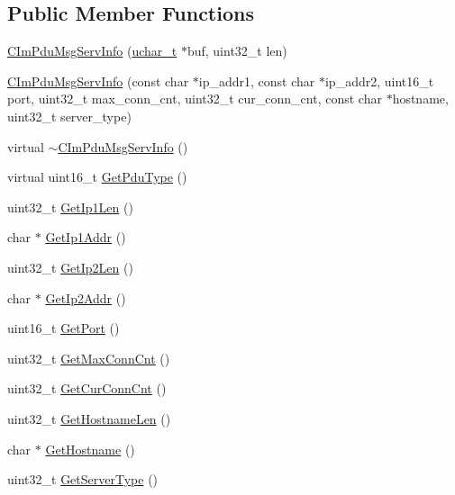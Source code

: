 \subsection*{Public Member Functions}
\begin{DoxyCompactItemize}
\item 
\hyperlink{class_c_im_pdu_msg_serv_info_a7532473060b500eb6f16480ea0c778d7}{C\+Im\+Pdu\+Msg\+Serv\+Info} (\hyperlink{base_2ostype_8h_a124ea0f8f4a23a0a286b5582137f0b8d}{uchar\+\_\+t} $\ast$buf, uint32\+\_\+t len)
\item 
\hyperlink{class_c_im_pdu_msg_serv_info_a37ccf7d9bf3b3b31d85e4bc34bd1525b}{C\+Im\+Pdu\+Msg\+Serv\+Info} (const char $\ast$ip\+\_\+addr1, const char $\ast$ip\+\_\+addr2, uint16\+\_\+t port, uint32\+\_\+t max\+\_\+conn\+\_\+cnt, uint32\+\_\+t cur\+\_\+conn\+\_\+cnt, const char $\ast$hostname, uint32\+\_\+t server\+\_\+type)
\item 
virtual \hyperlink{class_c_im_pdu_msg_serv_info_adecac9eab2944db745a3ff528f0d6c89}{$\sim$\+C\+Im\+Pdu\+Msg\+Serv\+Info} ()
\item 
virtual uint16\+\_\+t \hyperlink{class_c_im_pdu_msg_serv_info_a46ae101775a1fc2d1ea19c5fe73baa9d}{Get\+Pdu\+Type} ()
\item 
uint32\+\_\+t \hyperlink{class_c_im_pdu_msg_serv_info_a792373ba877467a24968414bc0d84208}{Get\+Ip1\+Len} ()
\item 
char $\ast$ \hyperlink{class_c_im_pdu_msg_serv_info_ac1275da2390e0ced17ec5bdf11ff0a36}{Get\+Ip1\+Addr} ()
\item 
uint32\+\_\+t \hyperlink{class_c_im_pdu_msg_serv_info_aa0ce659a3e27cc7c5a5fbb9fa70a4e9d}{Get\+Ip2\+Len} ()
\item 
char $\ast$ \hyperlink{class_c_im_pdu_msg_serv_info_aa07f96c3f12dea49bb9bd15c64539fc2}{Get\+Ip2\+Addr} ()
\item 
uint16\+\_\+t \hyperlink{class_c_im_pdu_msg_serv_info_acc3805f5db86e119db9a74e79d3ee4a5}{Get\+Port} ()
\item 
uint32\+\_\+t \hyperlink{class_c_im_pdu_msg_serv_info_a74feca6c4f3fb7251abf0c829a01f6f8}{Get\+Max\+Conn\+Cnt} ()
\item 
uint32\+\_\+t \hyperlink{class_c_im_pdu_msg_serv_info_a38db0781b6c336b8ccde517970256df0}{Get\+Cur\+Conn\+Cnt} ()
\item 
uint32\+\_\+t \hyperlink{class_c_im_pdu_msg_serv_info_abd39b4f02db884b11116fb1ff8d94e24}{Get\+Hostname\+Len} ()
\item 
char $\ast$ \hyperlink{class_c_im_pdu_msg_serv_info_a0d1c411da53d116d5cb71023d55c373f}{Get\+Hostname} ()
\item 
uint32\+\_\+t \hyperlink{class_c_im_pdu_msg_serv_info_a445bc52b5450aa7f561f5efa32b22c8c}{Get\+Server\+Type} ()
\end{DoxyCompactItemize}
